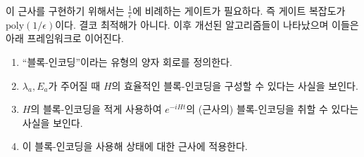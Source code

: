 \documentclass[a4paper,atbegshi,chapter,]{oblivoir}
\begin{document}
이 근사를 구현하기 위해서는 $\frac{1}{\epsilon}$에 비례하는 게이트가 필요하다.
즉 게이트 복잡도가 $\textrm{poly}(1/\epsilon)$이다. 결코 최적해가 아니다. 
이후 개선된 알고리즘들이 나타났으며 이들은 아래 프레임워크로 이어진다.
\begin{mdframed}
\begin{enumerate}[label=(\roman*)]
  \item ``블록-인코딩''이라는 유형의 양자 회로를 정의한다.
  \item $\lambda_a, E_a$가 주어질 때 $H$의 효율적인 블록-인코딩을 구성할 수
    있다는 사실을 보인다.
  \item $H$의 블록-인코딩을 적게 사용하여 $e^{-iHt}$의 (근사의) 블록-인코딩을
    취할 수 있다는 사실을 보인다.
  \item 이 블록-인코딩을 사용해 상태에 대한 근사에 적용한다.
\end{enumerate}
\end{mdframed}
\end{document}
